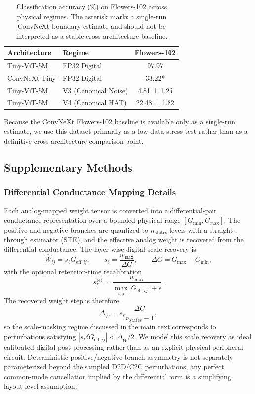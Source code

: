\begin{table}[ht]
\centering
\caption{Classification accuracy (\%) on Flowers-102 across physical regimes. The asterisk marks a single-run ConvNeXt boundary estimate and should not be interpreted as a stable cross-architecture baseline.}
\label{tab:supp-flowers-results}
\begin{tabular}{llc}
\toprule
\textbf{Architecture} & \textbf{Regime} & \textbf{Flowers-102} \\
\midrule
Tiny-ViT-5M & FP32 Digital & 97.97 \\
ConvNeXt-Tiny & FP32 Digital & 33.22* \\
Tiny-ViT-5M & V3 (Canonical Noise) & 4.81 ± 1.25 \\
Tiny-ViT-5M & V4 (Canonical HAT) & 22.48 ± 1.82 \\
\bottomrule
\end{tabular}
\end{table}

Because the ConvNeXt Flowers-102 baseline is available only as a single-run estimate, we use this dataset primarily as a low-data stress test rather than as a definitive cross-architecture comparison point.

\FloatBarrier

\subsection{Supplementary Methods}
\label{subsec:supp-methods}

\subsubsection{Differential Conductance Mapping Details}

Each analog-mapped weight tensor is converted into a differential-pair conductance representation over a bounded physical range $[G_{\min}, G_{\max}]$. The positive and negative branches are quantized to $n_{\mathrm{states}}$ levels with a straight-through estimator (STE), and the effective analog weight is recovered from the differential conductance. The layer-wise digital scale recovery is
\[
\hat{W}_{ij}=s_{\ell}G_{\mathrm{eff},ij},
\qquad
s_{\ell}=\frac{w_{\max}}{\Delta G},
\qquad
\Delta G = G_{\max}-G_{\min},
\]
with the optional retention-time recalibration
\[
s_{\ell}^{\mathrm{ret}}=\frac{w_{\max}}{\max_{i,j}|G_{\mathrm{eff},ij}|+\epsilon}.
\]
The recovered weight step is therefore
\[
\Delta_{\hat{W}} = s_{\ell}\frac{\Delta G}{n_{\mathrm{states}}-1},
\]
so the scale-masking regime discussed in the main text corresponds to perturbations satisfying $|s_{\ell}\delta G_{\mathrm{eff},ij}| < \Delta_{\hat{W}}/2$. We model this scale recovery as ideal calibrated digital post-processing rather than as an explicit physical peripheral circuit. Deterministic positive/negative branch asymmetry is not separately parameterized beyond the sampled D2D/C2C perturbations; any perfect common-mode cancellation implied by the differential form is a simplifying layout-level assumption.

